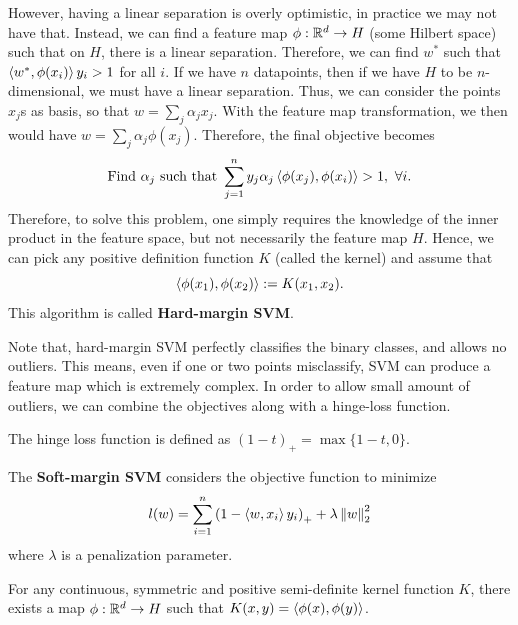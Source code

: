 \documentclass[12pt]{article}
\begin{document}
However, having a linear separation is overly optimistic, in practice we may not have that. Instead, we can find a feature map $\phi : \mathbb{R}^d \rightarrow H$ (some Hilbert space) such that on $H$, there is a linear separation. Therefore, we can find $w^\ast$ such that $\left\langle w^\ast, \phi(x_i) \right\rangle y_i > 1$ for all $i$. If we have $n$ datapoints, then if we have $H$ to be $n$-dimensional, we must have a linear separation. Thus, we can consider the points $x_j$s as basis, so that $w = \sum_{j} \alpha_j x_j$. With the feature map transformation, we then would have $w = \sum_j \alpha_j \phi(x_j)$. Therefore, the final objective becomes
\begin{equation*}
    \text{Find } \alpha_j \text{ such that } \sum_{j=1}^n y_j \alpha_j \left\langle \phi(x_j), \phi(x_i) \right\rangle > 1, \ \forall i.
\end{equation*}
\noindent Therefore, to solve this problem, one simply requires the knowledge of the inner product in the feature space, but not necessarily the feature map $H$. Hence, we can pick any positive definition function $K$ (called the kernel) and assume that
\begin{equation*}
    \left\langle \phi(x_1), \phi(x_2) \right\rangle := K(x_1, x_2).
\end{equation*}
\noindent This algorithm is called \textbf{Hard-margin SVM}.

Note that, hard-margin SVM perfectly classifies the binary classes, and allows no outliers. This means, even if one or two points misclassify, SVM can produce a feature map which is extremely complex. In order to allow small amount of outliers, we can combine the objectives along with a hinge-loss function.

\begin{definitionbox}
    The hinge loss function is defined as $(1-t)_{+} = \max\{ 1 - t, 0 \}$.
\end{definitionbox}

The \textbf{Soft-margin SVM} considers the objective function to minimize
\begin{equation*}
    l(w) = \sum_{i=1}^n \left( 1 - \left\langle w, x_i \right\rangle y_i \right)_{+} + \lambda \left\Vert w \right\Vert_2^2
\end{equation*}
\noindent where $\lambda$ is a penalization parameter. 

\begin{theorembox}[Mercer]
    For any continuous, symmetric and positive semi-definite kernel function $K$, there exists a map $\phi: \mathbb{R}^d \rightarrow H$ such that $K(x, y) = \left\langle \phi(x), \phi(y) \right\rangle$.
\end{theorembox}
\end{document}
